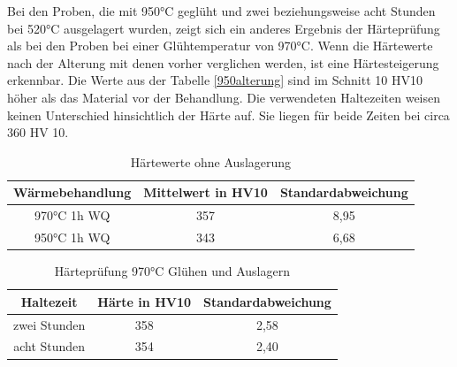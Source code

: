 \documentclass[a4paper, 11pt]{tubsreprt}
\begin{document}
Bei den Proben, die mit 950°C geglüht und zwei beziehungsweise acht Stunden bei 520°C ausgelagert wurden, zeigt sich ein anderes Ergebnis der Härteprüfung als bei den Proben bei einer Glühtemperatur von 970°C. Wenn die Härtewerte nach der Alterung mit denen vorher verglichen werden, ist eine Härtesteigerung erkennbar. Die Werte aus der Tabelle \ref{950alterung} sind im Schnitt 10 HV10 höher als das Material vor der Behandlung. Die verwendeten Haltezeiten weisen keinen Unterschied hinsichtlich der Härte auf. Sie liegen für beide Zeiten bei circa 360 HV 10.
\begin{table}[t]	%
\begin{tabular}{c|c|c}
Wärmebehandlung & Mittelwert in HV10 & Standardabweichung \\
\hline 
970°C 1h WQ	& 357 & 8,95\\
\hline
950°C 1h WQ & 343 & 6,68 \\


\end{tabular}
\caption{Härtewerte ohne Auslagerung}
\label{Hearte ohne Behandlung}
\end{table}
\begin{table}[t] 	%
\begin{tabular}{c | c | c}
Haltezeit & Härte in HV10 & Standardabweichung \\
\hline
zwei Stunden & 358 & 2,58 \\
\hline
acht Stunden & 354 & 2,40 \\


\end{tabular}
\caption{Härteprüfung 970°C Glühen und Auslagern}
\label{heartepruefung970 inkl auslagern}
\end{table}
\end{document}
